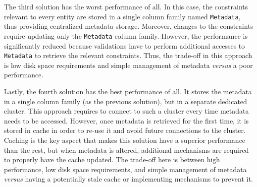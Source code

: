 The third solution has the worst performance of all. In this case, the
constraints relevant to every entity are  stored in a single column family
named \texttt{Metadata}, thus providing centralized metadata storage. Moreover, 
changes to the constraints require updating only the \texttt{Metadata} column
family. However, the performance is significantly reduced
because validations have to perform additional accesses to \texttt{Metadata} to
retrieve the relevant constraints. Thus, the trade-off in this
approach is low disk space requirements and simple management of metadata
\textit{versus} a  poor performance.

Lastly, the fourth solution has the best performance of all. It stores  
the metadata in a single column family (as the previous solution), but in  a
separate dedicated cluster. This approach requires to connect to such a cluster
every time metadata needs to be accessed. However, once metadata is
retrieved for the first time, it is stored in cache in order to re-use it
and avoid future connections to the cluster. Caching is the key aspect that
makes this solution have a superior performance than the rest, but when
 metadata is altered, additional mechanisms are required  to properly
 have the cache updated. The trade-off here is between high performance,  low
 disk space requirements, and simple management of metadata \textit{versus} having a
 potentially stale cache or implementing mechanisms to prevent it.




